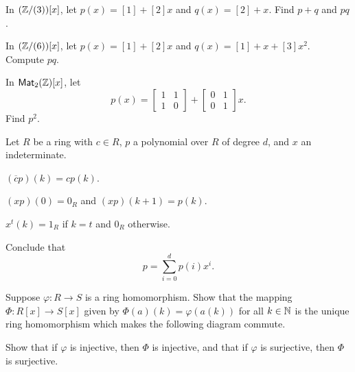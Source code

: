 \Exercises%

\begin{exercise}
\begin{proplist}
\item In \((\mathbb{Z}/(3))[x]\), let \(p(x) = [1] + [2]x\) and \(q(x) = [2] + x\). Find \(p+q\) and \(pq\).
\item In \((\mathbb{Z}/(6))[x]\), let \(p(x) = [1] + [2]x\) and \(q(x) = [1] + x + [3]x^2\). Compute \(pq\).\item In \(\mathsf{Mat}_{2}(\mathbb{Z})[x]\), let \[ p(x) = \begin{bmatrix} 1 & 1 \\ 1 & 0 \end{bmatrix} + \begin{bmatrix} 0 & 1 \\ 0 & 1 \end{bmatrix} x. \] Find \(p^2\).
\end{proplist}
\end{exercise}

\begin{exercise} \label{exerc:poly-expand}
Let $R$ be a ring with $c \in R$, $p$ a polynomial over $R$ of degree $d$, and $x$ an indeterminate.
\begin{proplist}
\item $(\overline{c}p)(k) = cp(k)$.
\item $(xp)(0) = 0_R$ and $(xp)(k+1) = p(k)$.
\item $x^t(k) = 1_R$ if $k = t$ and $0_R$ otherwise.
\item Conclude that \[ p = \sum_{i=0}^d p(i)x^i. \]
\end{proplist}
\end{exercise}

\begin{exercise}
Suppose \(\varphi : R \rightarrow S\) is a ring homomorphism. Show that the mapping \(\Phi : R[x] \rightarrow S[x]\) given by \(\Phi(a)(k) = \varphi(a(k))\) for all \(k \in \mathbb{N}\) is the unique ring homomorphism which makes the following diagram commute.
\begin{center}
\end{center}
Show that if \(\varphi\) is injective, then \(\Phi\) is injective, and that if \(\varphi\) is surjective, then \(\Phi\) is surjective.
\end{exercise}

